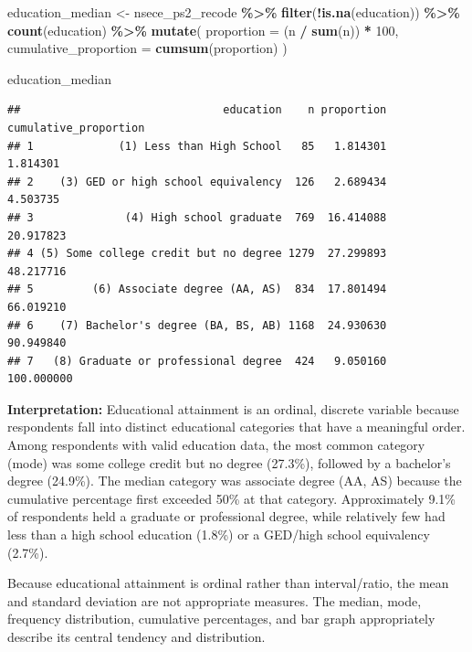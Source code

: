 \documentclass[
]{article}
\newenvironment{Shaded}{\begin{snugshade}}{\end{snugshade}}
\newcommand{\AttributeTok}[1]{\textcolor[rgb]{0.13,0.29,0.53}{#1}}
\newcommand{\DecValTok}[1]{\textcolor[rgb]{0.00,0.00,0.81}{#1}}
\newcommand{\FunctionTok}[1]{\textcolor[rgb]{0.13,0.29,0.53}{\textbf{#1}}}
\newcommand{\NormalTok}[1]{#1}
\newcommand{\OtherTok}[1]{\textcolor[rgb]{0.56,0.35,0.01}{#1}}
\newcommand{\SpecialCharTok}[1]{\textcolor[rgb]{0.81,0.36,0.00}{\textbf{#1}}}
\begin{document}
\begin{Shaded}
\begin{Highlighting}[]
\NormalTok{education\_median }\OtherTok{\textless{}{-}}
\NormalTok{  nsece\_ps2\_recode }\SpecialCharTok{\%\textgreater{}\%}
  \FunctionTok{filter}\NormalTok{(}\SpecialCharTok{!}\FunctionTok{is.na}\NormalTok{(education)) }\SpecialCharTok{\%\textgreater{}\%}
  \FunctionTok{count}\NormalTok{(education) }\SpecialCharTok{\%\textgreater{}\%}
  \FunctionTok{mutate}\NormalTok{(}
    \AttributeTok{proportion =}\NormalTok{ (n }\SpecialCharTok{/} \FunctionTok{sum}\NormalTok{(n)) }\SpecialCharTok{*} \DecValTok{100}\NormalTok{,}
    \AttributeTok{cumulative\_proportion =} \FunctionTok{cumsum}\NormalTok{(proportion)}
\NormalTok{  )}

\NormalTok{education\_median}
\end{Highlighting}
\end{Shaded}

\begin{verbatim}
##                               education    n proportion cumulative_proportion
## 1             (1) Less than High School   85   1.814301              1.814301
## 2    (3) GED or high school equivalency  126   2.689434              4.503735
## 3              (4) High school graduate  769  16.414088             20.917823
## 4 (5) Some college credit but no degree 1279  27.299893             48.217716
## 5         (6) Associate degree (AA, AS)  834  17.801494             66.019210
## 6    (7) Bachelor's degree (BA, BS, AB) 1168  24.930630             90.949840
## 7   (8) Graduate or professional degree  424   9.050160            100.000000
\end{verbatim}

\textbf{Interpretation:} Educational attainment is an ordinal, discrete
variable because respondents fall into distinct educational categories
that have a meaningful order. Among respondents with valid education
data, the most common category (mode) was some college credit but no
degree (27.3\%), followed by a bachelor's degree (24.9\%). The median
category was associate degree (AA, AS) because the cumulative percentage
first exceeded 50\% at that category. Approximately 9.1\% of respondents
held a graduate or professional degree, while relatively few had less
than a high school education (1.8\%) or a GED/high school equivalency
(2.7\%).

Because educational attainment is ordinal rather than interval/ratio,
the mean and standard deviation are not appropriate measures. The
median, mode, frequency distribution, cumulative percentages, and bar
graph appropriately describe its central tendency and distribution.
\end{document}
